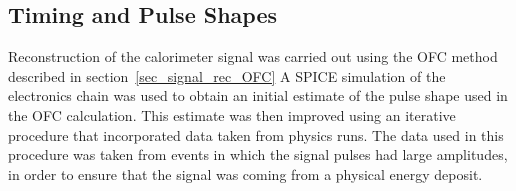 %
% 
%
% 
%
%
%
%
%
%
%
%
%
%
%
%
%
%
%
%
%



\subsection{Timing and Pulse Shapes}
\label{sec_TBoverview_timing}
Reconstruction of the calorimeter signal was carried out using the OFC method described in section~\ref{sec_signal_rec_OFC} A SPICE \cite{SPICE_paper} simulation of the electronics chain was used to obtain an initial estimate of the pulse shape used in the OFC calculation. This estimate was then improved using an iterative procedure that incorporated data taken from physics runs. The data used in this procedure was taken from events in which the signal pulses had large amplitudes, in order to ensure that the signal was coming from a physical energy deposit.

